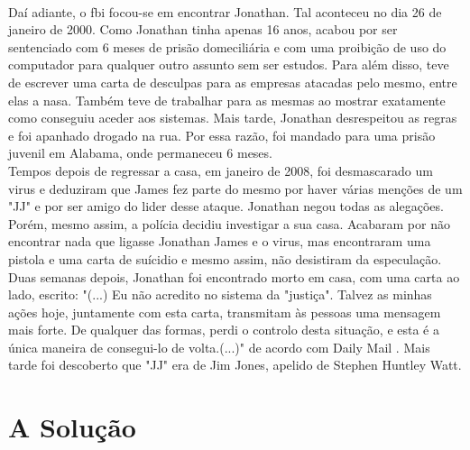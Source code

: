 \documentclass{report}
\begin{document}
\\ \indent Daí adiante, o \ac{fbi} focou-se em encontrar Jonathan. Tal aconteceu no dia 26 de janeiro de 2000. Como Jonathan tinha apenas 16 anos, acabou por ser sentenciado com 6 meses de prisão domeciliária e com uma proibição de uso do computador para qualquer outro assunto sem ser estudos. Para além disso, teve de escrever uma carta de desculpas para as empresas atacadas pelo mesmo, entre elas a \ac{nasa}. Também teve de trabalhar para as mesmas ao mostrar exatamente como conseguiu aceder aos sistemas. Mais tarde, Jonathan desrespeitou as regras e foi apanhado drogado na rua. Por essa razão, foi mandado para uma prisão juvenil em Alabama, onde permaneceu 6 meses. \cite{jonathanjames} \\ \indent Tempos depois de regressar a casa, em janeiro de 2008, foi desmascarado um virus e deduziram que James fez parte do mesmo por haver várias menções de um "JJ" e por ser amigo do lider desse ataque. Jonathan negou todas as alegações. Porém, mesmo assim, a polícia decidiu investigar a sua casa. Acabaram por não encontrar nada que ligasse Jonathan James e o virus, mas encontraram uma pistola e uma carta de suícidio e mesmo assim, não desistiram da especulação. Duas semanas depois, Jonathan foi encontrado morto em casa, com uma carta ao lado, escrito: "(...) Eu não acredito no sistema da "justiça". Talvez as minhas ações hoje, juntamente com esta carta, transmitam às pessoas uma mensagem mais forte. De qualquer das formas, perdi o controlo desta situação, e esta é a única maneira de consegui-lo de volta.(...)" de acordo com Daily Mail \cite{osmaisnotaveis}. Mais tarde foi descoberto que "JJ" era de Jim Jones, apelido de Stephen Huntley Watt.

\chapter{A Solução}


\label{chap.a-solução}
\end{document}
